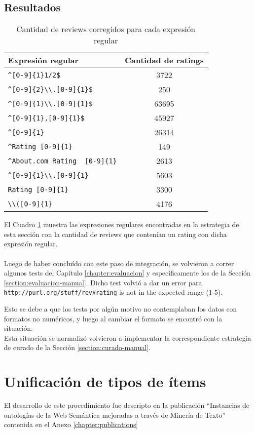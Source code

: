  \subsection*{Resultados}
 \begin{table}[h]
 \begin{tabular}{| l | c |}\hline
 Expresión regular & Cantidad de ratings \\\hline
 \verb|^[0-9]{1}1/2$| & 3722\\
 \verb|^[0-9]{2}\\.[0-9]{1}$| & 250\\
 \verb|^[0-9]{1}\\.[0-9]{1}$| & 63695\\
 \verb|^[0-9]{1},[0-9]{1}$| & 45927\\
 \verb|^[0-9]{1} | & 26314\\
 \verb|^Rating [0-9]{1}| & 149\\
 \verb|^About.com Rating  [0-9]{1}| & 2613\\
 \verb|^[0-9]{1}\\.[0-9]{1} | & 5603\\
 \verb|Rating [0-9]{1}| & 3300\\
 \verb|\\([0-9]{1} | & 4176 \\\hline
 \end{tabular}
 \caption{Cantidad de reviews corregidos para cada expresión regular}
\label{table:RegExpressionsRatingCorrected}
\end{table}
 El Cuadro \ref{table:RegExpressionsRatingCorrected} muestra las expresiones regulares encontradas en la estrategia de esta sección con 
 la cantidad de reviews que contenían un rating con dicha expresión regular.
 \\\\
 Luego de haber concluído con este paso de integración, se volvieron a correr algunos tests del Capítulo \ref{chapter:evaluacion} y 
 específicamente los de la Sección \ref{section:evaluacion-manual}. Dicho test volvió a dar un error para 
 \verb |http://purl.org/stuff/rev#rating| is not in the expected range (1-5).
 
 Esto se debe a que los tests por algún motivo no contemplaban los datos con formatos no numéricos, y luego al cambiar el formato 
 se encontró con la situación.\\
 Esta situación se normalizó volvieron a implementar la correspondiente estrategia de curado de la Sección \ref{section:curado-manual}.
 
 \section{Unificación de tipos de ítems}
\label{section:unificacion-items}

El desarrollo de este procedimiento fue descripto en la publicación  “Instancias de ontologías de la Web Semántica mejoradas a través de Minería de Texto” contenida en el Anexo \ref{chapter:publications} 